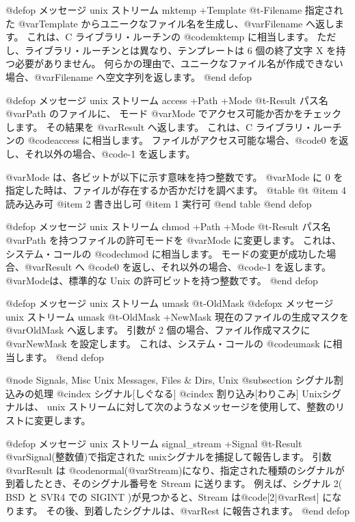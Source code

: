 {{{{@defop {メッセージ} {unix ストリーム}  mktemp +Template @t{-}Filename
指定された @var{Template} からユニークなファイル名を生成し、@var{Filename} へ返します。
これは、C ライブラリ・ルーチンの @code{mktemp} に相当します。
ただし、ライブラリ・ルーチンとは異なり、テンプレートは 6 個の終了文字 X を持つ必要がありません。
何らかの理由で、ユニークなファイル名が作成できない場合、@var{Filename} へ空文字列を返します。
@end defop  

@defop {メッセージ}  {unix ストリーム}  access +Path +Mode @t{-}Result
パス名 @var{Path} のファイルに、
モード @var{Mode} でアクセス可能か否かをチェックします。
その結果を @var{Result} へ返します。
これは、C ライブラリ・ルーチンの @code{access} に相当します。
ファイルがアクセス可能な場合、@code{0} を返し、それ以外の場合、@code{-1} を返します。

@var{Mode} は、各ビットが以下に示す意味を持つ整数です。
@var{Mode} に 0 を指定した時は、ファイルが存在するか否かだけを調べます。
@table @t
@item 4
読み込み可
@item 2
書き出し可
@item 1
実行可
@end table
@end defop

@defop {メッセージ} {unix ストリーム}  chmod +Path +Mode @t{-}Result
パス名 @var{Path} を持つファイルの許可モードを @var{Mode} に変更します。
これは、システム・コールの @code{chmod} に相当します。
モードの変更が成功した場合、@var{Result} へ @code{0} を返し、それ以外の場合、@code{-1} を返します。
@var{Mode}は、標準的な Unix の許可ビットを持つ整数です。
@end defop 

@defop {メッセージ} {unix ストリーム}  umask @t{-}OldMask
@defopx {メッセージ} {unix ストリーム}  umask @t{-}OldMask +NewMask
現在のファイルの生成マスクを @var{OldMask} へ返します。
引数が 2 個の場合、ファイル作成マスクに @var{NewMask} を設定します。
これは、システム・コールの @code{umask} に相当します。
@end defop 

@node Signals, Misc Unix Messages, Files & Dirs, Unix
@subsection シグナル割込みの処理
@cindex シグナル[しぐなる]
@cindex 割り込み[わりこみ]
Unixシグナルは、 unix ストリームに対して次のようなメッセージを使用して、整数のリストに変更します。

@defop {メッセージ} {unix ストリーム}  signal_stream +Signal @t{-}Result
@var{Signal}(整数値)で指定された unixシグナルを捕捉して報告します。
引数 @var{Result} は @code{normal(@var{Stream})}になり、指定された種類のシグナルが到着したとき、そのシグナル番号を Stream に送ります。
例えば、シグナル 2( BSD と SVR4 での SIGINT )が見つかると、Stream は@code{[2|@var{Rest}]} になります。
その後、到着したシグナルは、@var{Rest} に報告されます。
@end defop

}}}}
